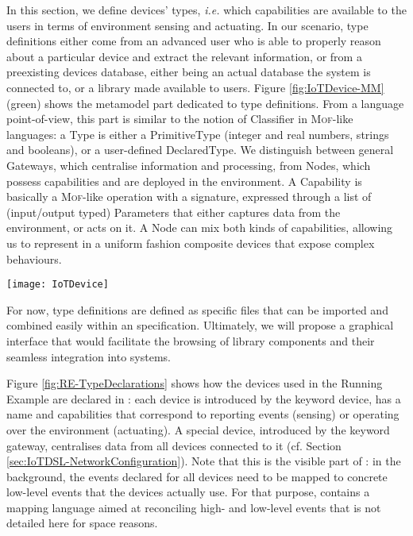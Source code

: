 In this section, we define \IOT devices' types, \textit{i.e.} which capabilities are available to the users in terms of environment sensing and actuating. In our scenario, type definitions either come from an advanced user who is able to properly reason about a particular device and extract the relevant information, or from a preexisting devices database, either being an actual database the system is connected to, or a library made available to users. Figure \ref{fig:IoTDevice-MM} (green) shows the metamodel part dedicated to type definitions. From a language point-of-view, this part is similar to the notion of \textsf{Classifier} in \textsc{Mof}-like languages: a \textsf{Type} is either a \textsf{PrimitiveType} (integer and real numbers, strings and booleans), or a user-defined \textsf{DeclaredType}. We distinguish between general \textsf{Gateway}s, which centralise information and processing, from \textsf{Node}s, which possess capabilities and are deployed in the environment. A \textsf{Capability} is basically a \textsc{Mof}-like operation with a signature, expressed through a list of (input/output typed) \textsf{Parameter}s that either captures data from the environment, or acts on it. A \textsf{Node} can mix both kinds of capabilities, allowing us to represent in a uniform fashion composite devices that expose complex behaviours.

\begin{figure*}%
\texttt{[image: IoTDevice]}%
\caption{Metamodel of \IOTDSL, separated in three concerns: in green, \emph{Type Definition} captures devices' capabilities; in purple, \emph{Network Configuration} details how device instances are connected to each others; and in yellow, \emph{Business Rules} defines the functionalities expected from the IoT installation.}%
\label{fig:IoTDevice-MM}%
\end{figure*}

For now, type definitions are defined as specific files that can be imported and combined easily within an \IOT specification. Ultimately, we will propose a graphical interface that would facilitate the browsing of library components and their seamless integration into \IOT systems.

Figure \ref{fig:RE-TypeDeclarations} shows how the devices used in the Running Example are declared in \IOTDSL: each device is introduced by the keyword \textsf{device}, has a name and capabilities that correspond to reporting events (\textsf{sensing}) or operating over the environment (\textsf{actuating}). A special device, introduced by the keyword \textsf{gateway}, centralises data from all devices connected to it (cf. Section \ref{sec:IoTDSL-NetworkConfiguration}). Note that this is the visible part of \IOTDSL: in the background, the events declared for all devices need to be mapped to concrete low-level events that the devices actually use. For that purpose, \IOTDSL contains a mapping language aimed at reconciling high- and low-level events that is not detailed here for space reasons.

